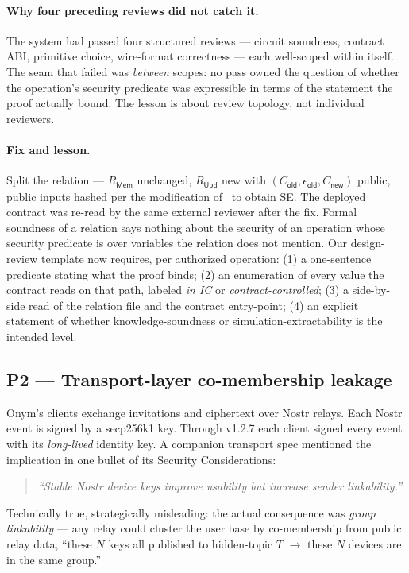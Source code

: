 \documentclass[11pt,a4paper]{article}
\newcommand{\Cold}{C_{\mathsf{old}}}
\newcommand{\Cnew}{C_{\mathsf{new}}}
\newcommand{\eold}{\epsilon_{\mathsf{old}}}
\newcommand{\Rmem}{R_{\mathsf{Mem}}}
\newcommand{\Rupd}{R_{\mathsf{Upd}}}
\begin{document}
\paragraph{Why four preceding reviews did not catch it.}
The system had passed four structured reviews --- circuit soundness, contract ABI, primitive choice, wire-format correctness --- each well-scoped within itself. The seam that failed was \emph{between} scopes: no pass owned the question of whether the operation's security predicate was expressible in terms of the statement the proof actually bound. The lesson is about review topology, not individual reviewers.

\paragraph{Fix and lesson.}
Split the relation --- $\Rmem$ unchanged, $\Rupd$ new with $(\Cold, \eold, \Cnew)$ public, public inputs hashed per the modification of~\cite{baghery2021} to obtain SE. The deployed contract was re-read by the same external reviewer after the fix. Formal soundness of a relation says nothing about the security of an operation whose security predicate is over variables the relation does not mention. Our design-review template now requires, per authorized operation: (1) a one-sentence predicate stating what the proof binds; (2) an enumeration of every value the contract reads on that path, labeled \emph{in IC} or \emph{contract-controlled}; (3) a side-by-side read of the relation file and the contract entry-point; (4) an explicit statement of whether knowledge-soundness or simulation-extractability is the intended level.

\subsection{P2 --- Transport-layer co-membership leakage}

Onym's clients exchange invitations and ciphertext over Nostr relays. Each Nostr event is signed by a secp256k1 key. Through v1.2.7 each client signed every event with its \emph{long-lived} identity key. A companion transport spec mentioned the implication in one bullet of its Security Considerations:

\begin{quote}
\emph{``Stable Nostr device keys improve usability but increase sender linkability.''}
\end{quote}

Technically true, strategically misleading: the actual consequence was \emph{group linkability} --- any relay could cluster the user base by co-membership from public relay data, ``these $N$ keys all published to hidden-topic $T$ $\to$ these $N$ devices are in the same group.''
\end{document}
